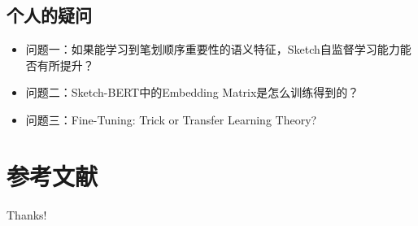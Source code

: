 \documentclass[UTF-8,fontset = none]{ctexbeamer}
\begin{document}
\subsection{个人的疑问}
\begin{frame}
    \begin{itemize}
        \item 问题一：如果能学习到笔划顺序重要性的语义特征，Sketch自监督学习能力能否有所提升？
        \item 问题二：Sketch-BERT中的Embedding Matrix是怎么训练得到的？       
        \item 问题三：Fine-Tuning: Trick or Transfer Learning Theory?
    \end{itemize}
\end{frame}

\section{参考文献}

\begin{frame}[allowframebreaks]
    
    
\end{frame}

\begin{frame}
    \begin{center}
        {\Huge\calligra Thanks!}
    \end{center}
\end{frame}
\end{document}
